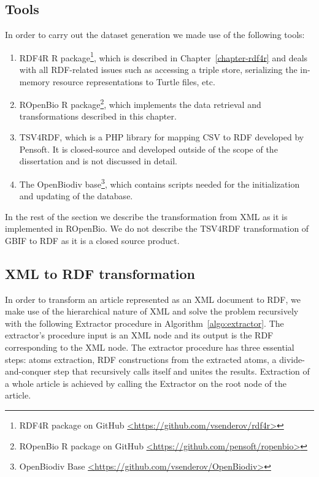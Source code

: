 \subsection{Tools}

In order to carry out the dataset generation we made use of the following tools:

\begin{enumerate}
\item{RDF4R R package\footnote{RDF4R package on GitHub \href{https://github.com/vsenderov/rdf4r}{\url{<https://github.com/vsenderov/rdf4r>}}}, which is described in Chapter~\ref{chapter-rdf4r} and deals with all RDF-related issues such as accessing a triple store, serializing the in-memory resource representations to Turtle files, etc.}
\item{ROpenBio R package\footnote{ROpenBio R package on GitHub \href{https://github.com/pensoft/ropenbio}{\url{<https://github.com/pensoft/ropenbio>}}}, which implements the data retrieval and transformations described in this chapter.}
\item{TSV4RDF, which is a PHP library for mapping CSV to RDF developed by Pensoft. It is closed-source and developed outside of the scope of the dissertation and is not discussed in detail.}
\item{The OpenBiodiv base\footnote{OpenBiodiv Base \href{https://github.com/vsenderov/OpenBiodiv}{\url{<https://github.com/vsenderov/OpenBiodiv>}}}, which contains scripts needed for the initialization and updating of the database.}
\end{enumerate}

In the rest of the section we describe the transformation from XML as it is implemented in ROpenBio. We do not describe the TSV4RDF transformation of GBIF to RDF as it is a closed source product.

\subsection{XML to RDF transformation}

In order to transform an article represented as an XML document to RDF, we make use of the hierarchical nature of XML and solve the problem recursively with the following Extractor procedure in Algorithm~\ref{algo:extractor}. The extractor's procedure input is an XML node and its output is the RDF corresponding to the XML node. The extractor procedure has three essential steps: atoms extraction, RDF constructions from the extracted atoms, a divide-and-conquer step that recursively calls itself and unites the results. Extraction of a whole article is achieved by calling the Extractor on the root node of the article.

